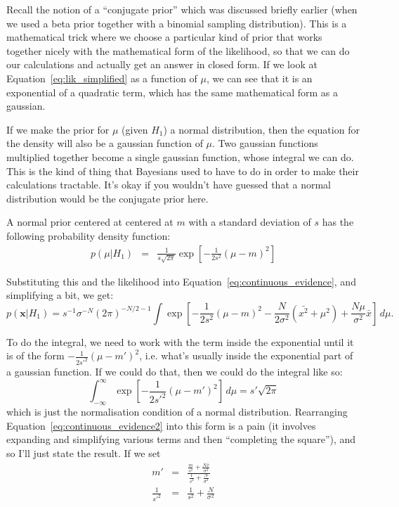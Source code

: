 Recall the notion of a ``conjugate prior'' which was discussed briefly earlier
(when we used a beta prior together with a binomial sampling distribution).
This is a mathematical trick where we choose a particular kind of prior
that works together nicely with the mathematical form of the likelihood, so
that we can do our calculations and actually get an answer in closed form.
If we look at Equation~\ref{eq:lik_simplified} as a function of $\mu$, we
can see that it is an exponential of a quadratic term, which has the same
mathematical form as a gaussian.

If we make the prior for $\mu$ (given $H_1$) a normal distribution, then the
equation for the density will also be a gaussian function of $\mu$. Two
gaussian functions multiplied together become a single gaussian function, whose
integral we can do. This is the kind of thing that Bayesians used to have to
do in order to make their calculations tractable. It's okay if you wouldn't
have guessed that a normal distribution would be the conjugate prior here.

A normal prior centered at centered at $m$ with a standard deviation of $s$
has the following probability density function:
\begin{eqnarray}
p(\mu | H_1) &=& \frac{1}{s\sqrt{2\pi}}\exp
\left[-\frac{1}{2s^2}\left(\mu - m\right)^2\right]
\end{eqnarray}

Substituting this and the likelihood into Equation~\ref{eq:continuous_evidence},
and simplifying a bit, we get:
\begin{equation}
p(\boldsymbol{x}|H_1) = s^{-1}
\sigma^{-N}(2\pi)^{-N/2-1} \int 
\exp
\left[-\frac{1}{2s^2}\left(\mu - m\right)^2-\frac{N}{2\sigma^2}\left(\bar{x^2} + \mu^2\right) + \frac{N\mu}{\sigma^2}\bar{x}\right] \, d\mu.\label{eq:continuous_evidence2}
\end{equation}

To do the integral, we need to work with the term inside the exponential until
it is of the form $-\frac{1}{2s'^2}(\mu - m')^2$, i.e. what's usually inside
the exponential part of a gaussian function. If we could do that, then we
could do the integral like so:
\begin{equation}
\int_{-\infty}^{\infty} \exp\left[-\frac{1}{2s'^2}(\mu - m')^2\right]\, d\mu
= s'\sqrt{2\pi}
\end{equation}
which is just the normalisation condition of a normal distribution.
Rearranging Equation~\ref{eq:continuous_evidence2} into this form is a pain
(it involves expanding and simplifying various terms and then
``completing the square''), and so I'll just state the result. If we set
\begin{eqnarray}
m' &=& \frac{\frac{m}{s^2} + \frac{N\bar{x}}{\sigma^2}}{\frac{1}{s^2} + \frac{N}{\sigma^2}}\\
\frac{1}{s'^2} &=& \frac{1}{s^2} + \frac{N}{\sigma^2}
\end{eqnarray}


